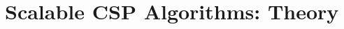 \documentclass[screen,sigconf,anonymous,review]{acmart}
\begin{document}
%

%

\section{Scalable CSP Algorithms: Theory}
\label{sec:chd}


%

%

%

%

%
\end{document}
